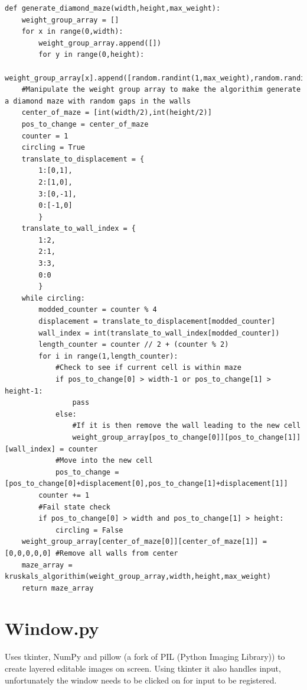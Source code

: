 \documentclass{article}
\begin{document}
\begin{lstlisting}
def generate_diamond_maze(width,height,max_weight):
    weight_group_array = []
    for x in range(0,width):
        weight_group_array.append([])
        for y in range(0,height):
            weight_group_array[x].append([random.randint(1,max_weight),random.randint(1,max_weight),random.randint(1,max_weight),random.randint(1,max_weight),0])
    #Manipulate the weight group array to make the algorithim generate a diamond maze with random gaps in the walls
    center_of_maze = [int(width/2),int(height/2)]
    pos_to_change = center_of_maze
    counter = 1
    circling = True
    translate_to_displacement = {
        1:[0,1],
        2:[1,0],
        3:[0,-1],
        0:[-1,0]
        }
    translate_to_wall_index = {
        1:2,
        2:1,
        3:3,
        0:0
        }
    while circling:
        modded_counter = counter % 4
        displacement = translate_to_displacement[modded_counter]
        wall_index = int(translate_to_wall_index[modded_counter])
        length_counter = counter // 2 + (counter % 2)
        for i in range(1,length_counter):
            #Check to see if current cell is within maze
            if pos_to_change[0] > width-1 or pos_to_change[1] > height-1:
                pass
            else:
                #If it is then remove the wall leading to the new cell
                weight_group_array[pos_to_change[0]][pos_to_change[1]][wall_index] = counter
            #Move into the new cell
            pos_to_change = [pos_to_change[0]+displacement[0],pos_to_change[1]+displacement[1]]
        counter += 1
        #Fail state check
        if pos_to_change[0] > width and pos_to_change[1] > height:
            circling = False
    weight_group_array[center_of_maze[0]][center_of_maze[1]] = [0,0,0,0,0] #Remove all walls from center
    maze_array = kruskals_algorithim(weight_group_array,width,height,max_weight)
    return maze_array 
\end{lstlisting}


\clearpage
\section{Window.py}
Uses tkinter, NumPy and pillow (a fork of PIL (Python Imaging Library)) to create layered editable images on screen. Using tkinter it also handles input, unfortunately the window needs to be clicked on for input to be registered.
\end{document}
